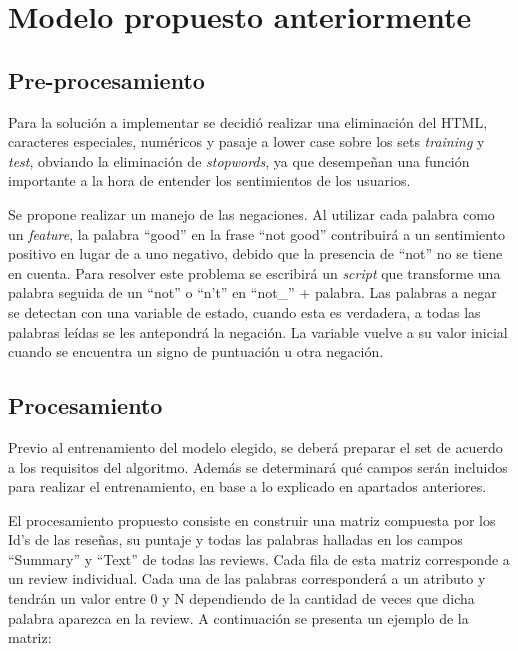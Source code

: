 \documentclass[10pt,a4paper]{article}
\begin{document}
\tableofcontents

\pagebreak

\section{Modelo propuesto anteriormente}

\subsection{Pre-procesamiento}
Para la solución a implementar se decidió realizar una eliminación del HTML, caracteres especiales, numéricos y pasaje a lower case sobre los sets \textit{training} y \textit{test}, obviando la eliminación de \textit{stopwords}, ya que desempeñan una función importante a la hora de entender los sentimientos de los usuarios.

Se propone realizar un manejo de las negaciones. Al utilizar cada palabra como un \textit{feature}, la palabra ``good'' en la frase ``not good'' contribuirá a un sentimiento positivo en lugar de a uno negativo, debido que la presencia de ``not'' no se tiene en cuenta. Para resolver este problema se escribirá un \textit{script} que transforme una palabra seguida de un ``not'' o ``n't'' en ``not\_'' + palabra. Las palabras a negar se detectan con una variable de estado, cuando esta es verdadera, a todas las palabras leídas se les antepondrá la negación. La variable vuelve a su valor inicial cuando se encuentra un signo de puntuación u otra negación. %

\subsection{Procesamiento}

Previo al entrenamiento del modelo elegido, se deberá preparar el set de acuerdo a los requisitos del algoritmo. Además se determinará qué campos serán incluidos para realizar el entrenamiento, en base a lo explicado en apartados anteriores.

El procesamiento propuesto consiste en construir una matriz compuesta por los Id's de las reseñas, su puntaje y todas las palabras halladas en los campos ``Summary'' y ``Text'' de  todas las reviews. Cada fila de esta matriz corresponde a un review individual. Cada una de las palabras corresponderá a un atributo y tendrán un valor entre 0 y N dependiendo de la cantidad de veces que dicha palabra aparezca en la review. A continuación se presenta un ejemplo de la matriz:
\end{document}
